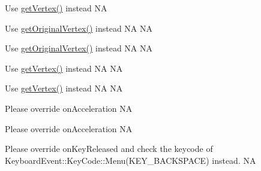 \begin{DoxyRefList}
Use \hyperlink{classGrid3D_aa39962eba8aa705b6b45115ff74a0c6a}{get\+Vertex()} instead  NA  
\item[\label{deprecated__deprecated000008}%
\Hypertarget{deprecated__deprecated000008}%
Member \hyperlink{classGrid3DAction_aa9ab3e0d2e07ab0a8227bbbd9c0b2021}{Grid3\+D\+Action\+:\+:original\+Vertex} (const \hyperlink{classVec2}{Vec2} \&position)]Use \hyperlink{classGrid3DAction_a8e614d5c3c368b1f2eee4a3e885f861f}{get\+Original\+Vertex()} instead  NA  NA 

Use \hyperlink{classGrid3DAction_a8e614d5c3c368b1f2eee4a3e885f861f}{get\+Original\+Vertex()} instead  NA  NA  
\item[\label{deprecated__deprecated000007}%
\Hypertarget{deprecated__deprecated000007}%
Member \hyperlink{classGrid3DAction_a75b5c44d0729a43476dff9ab6e7b281c}{Grid3\+D\+Action\+:\+:vertex} (const \hyperlink{classVec2}{Vec2} \&position)]Use \hyperlink{classGrid3DAction_a188dfc79a323f07b3aff441bced64201}{get\+Vertex()} instead  NA  NA 

Use \hyperlink{classGrid3DAction_a188dfc79a323f07b3aff441bced64201}{get\+Vertex()} instead  NA  NA  
\item[\label{deprecated__deprecated000026}%
\Hypertarget{deprecated__deprecated000026}%
Member \hyperlink{classLayer_aea727ae25fc6f47bd9ef029cb99c629a}{Layer\+:\+:did\+Accelerate} (\hyperlink{classAcceleration}{Acceleration} $\ast$acceleration\+Value) final]Please override on\+Acceleration  NA  
\item[\label{deprecated__deprecated000256}%
\Hypertarget{deprecated__deprecated000256}%
Member \hyperlink{classLayer_ad38c31e14fb4fb9561eede982d6b8ef5}{Layer\+:\+:did\+Accelerate} (\hyperlink{classAcceleration}{Acceleration} $\ast$) final]Please override on\+Acceleration  NA  
\item[\label{deprecated__deprecated000027}%
\Hypertarget{deprecated__deprecated000027}%
Member \hyperlink{classLayer_aea2ec8f77681b4fd1c988bbeeb3d1c22}{Layer\+:\+:key\+Back\+Clicked} () final]Please override on\+Key\+Released and check the keycode of Keyboard\+Event\+::\+Key\+Code\+::\+Menu(\+K\+E\+Y\+\_\+\+B\+A\+C\+K\+S\+P\+A\+C\+E) instead.  NA 


\end{DoxyRefList}
